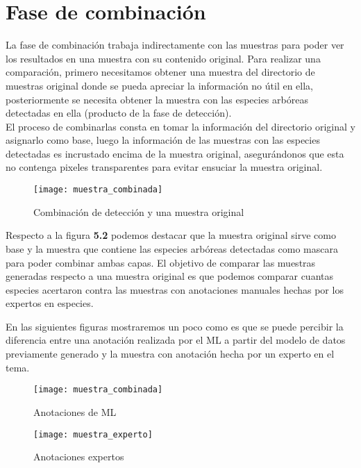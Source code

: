 \section{Fase de combinación}
La fase de combinación trabaja indirectamente con las muestras para poder ver los resultados en una muestra con su contenido original. Para realizar una comparación, primero necesitamos obtener una muestra del directorio de muestras original donde se pueda apreciar la información no útil en ella, posteriormente se necesita obtener la muestra con las especies arbóreas detectadas en ella (producto de la fase de detección).\\ 

El proceso de combinarlas consta en tomar la información del directorio original y asignarlo como base, luego la información de las muestras con las especies detectadas es incrustado encima de la muestra original, asegurándonos que esta no contenga pixeles transparentes para evitar ensuciar la muestra original.

\begin{figure}[H]
  \centering
  \begin{minipage}[b]{0.8\textwidth}
        \texttt{[image: muestra\_combinada]}
    \caption{Combinación de detección y una muestra original}
  \end{minipage}
\end{figure}

Respecto a la figura \textbf{5.2} podemos destacar que la muestra original sirve como base y la muestra que contiene las especies arbóreas detectadas como mascara para poder combinar ambas capas. El objetivo de comparar las muestras generadas respecto a una muestra original es que podemos comparar cuantas especies acertaron contra las muestras con anotaciones manuales hechas por los expertos en especies.

\break


En las siguientes figuras mostraremos un poco como es que se puede percibir la diferencia entre una anotación realizada por el ML a partir del modelo de datos previamente generado y la muestra con anotación hecha por un experto en el tema. \\

\begin{figure}[H]
  \centering
  \begin{minipage}[b]{0.4\textwidth}
    \texttt{[image: muestra\_combinada]}
    \caption{Anotaciones de ML}
  \end{minipage}
  \hfill
  \begin{minipage}[b]{0.4\textwidth}
    \texttt{[image: muestra\_experto]}
    \caption{Anotaciones expertos}
  \end{minipage}
\end{figure}

